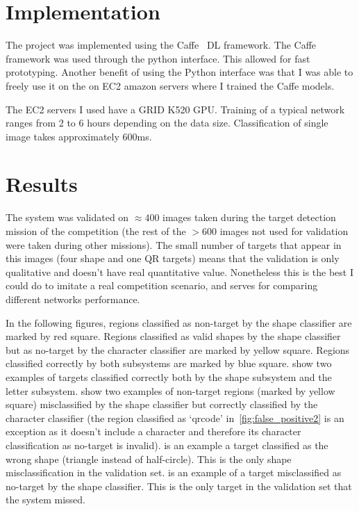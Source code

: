 \documentclass{article} %
\begin{document}
\section{Implementation}

The project was implemented using the Caffe~\cite{jia2014caffe} DL framework.
The Caffe framework was used through the python interface. This allowed for 
fast prototyping. Another benefit of using the Python interface was that I
was able to freely use it on the on EC2 amazon servers where I trained the Caffe
models.

The EC2 servers I used have a GRID K520 GPU. Training of a typical network ranges
from 2 to 6 hours depending on the data size. Classification of single image
takes approximately 600ms.

\section{Results}
\label{sec:results}

The system was validated on $\approx400$ images taken during the target detection mission
of the competition (the rest of the $>600$ images not used for validation were taken
during other missions). The small number of targets that appear in this images (four shape
and one QR targets) means that the validation is only qualitative and doesn't have
real quantitative value. Nonetheless this is the best I could do to imitate a real
competition scenario, and serves for comparing different networks performance.

In the following figures, regions classified as non-target by the shape classifier are
marked by red square. Regions classified as valid shapes by the shape classifier but
as no-target by the character classifier are marked by yellow square. Regions classified
correctly by both subsystems are marked by blue square.  show two examples of targets classified
correctly both by the shape subsystem and the letter subsystem. 
 show two examples of non-target regions
(marked by yellow square) misclassified by the shape classifier but correctly classified
by the character classifier (the region classified as `qrcode' in~\cref{fig:false_positive2}
is an exception as it doesn't include a character and therefore its character classification
as no-target is invalid).  is an example a target classified as the wrong
shape (triangle instead of half-circle). This is the only shape misclassification in the
validation set.  is an example of a target misclassified as no-target
by the shape classifier. This is the only target in the validation set that the system missed.
\end{document}
